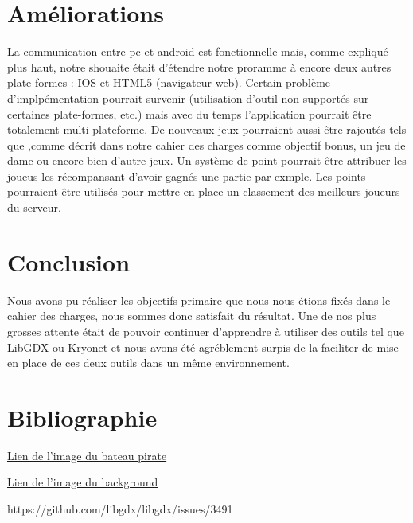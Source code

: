 \documentclass{report}
\begin{document}
\chapter{Améliorations}
La communication entre pc et android est fonctionnelle mais, comme expliqué plus haut, notre shouaite était d'étendre notre proramme à encore deux autres
plate-formes : IOS et HTML5 (navigateur web). Certain problème d'implpémentation pourrait survenir (utilisation d'outil non supportés sur certaines plate-formes, etc.)
mais avec du temps l'application pourrait être totalement multi-plateforme.
De nouveaux jeux pourraient aussi être rajoutés tels que ,comme décrit dans notre cahier des charges comme objectif bonus,
un jeu de dame ou encore bien d'autre jeux. Un système de point pourrait être attribuer les joueus les récompansant d'avoir gagnés une
partie par exmple. Les points pourraient être utilisés pour mettre en place un classement des meilleurs joueurs du serveur.

\chapter{Conclusion}
Nous avons pu réaliser les objectifs primaire que nous nous étions fixés dans le cahier des charges, nous
sommes donc satisfait du résultat. Une de nos plus grosses attente était de pouvoir continuer d'apprendre à
utiliser des outils tel que LibGDX ou Kryonet et nous avons été agréblement surpis de la faciliter de mise
en place de ces deux outils dans un même environnement.

\chapter{Bibliographie}

\href{http://www.flaticon.com/free-icon/pirate-ship_361245#term=pirate%20ship&page=1&position=6}{Lien de l'image du bateau pirate}

\href{https://www.dreamstime.com/stock-illustration-retro-comic-background-old-yellow-green-halftone-gradient-pop-art-style-image81648431}{Lien de l'image du background}


https://github.com/libgdx/libgdx/issues/3491
\end{document}
